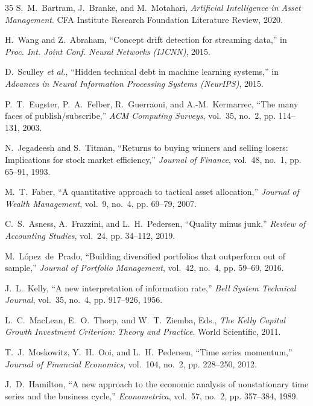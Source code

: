 \documentclass[10pt,twocolumn]{IEEEtran}
\begin{document}
\begin{thebibliography}{35}
S.~M.~Bartram, J.~Branke, and M.~Motahari, \emph{Artificial Intelligence in
Asset Management}. CFA Institute Research Foundation Literature Review, 2020.

H.~Wang and Z.~Abraham, ``Concept drift detection for streaming data,'' in
\emph{Proc. Int. Joint Conf. Neural Networks (IJCNN)}, 2015.

D.~Sculley \emph{et al.}, ``Hidden technical debt in machine learning
systems,'' in \emph{Advances in Neural Information Processing Systems
(NeurIPS)}, 2015.

P.~T.~Eugster, P.~A.~Felber, R.~Guerraoui, and A.-M.~Kermarrec, ``The many
faces of publish/subscribe,'' \emph{ACM Computing Surveys}, vol.~35, no.~2,
pp. 114--131, 2003.

N.~Jegadeesh and S.~Titman, ``Returns to buying winners and selling losers:
Implications for stock market efficiency,'' \emph{Journal of Finance},
vol.~48, no.~1, pp. 65--91, 1993.

M.~T.~Faber, ``A quantitative approach to tactical asset allocation,''
\emph{Journal of Wealth Management}, vol.~9, no.~4, pp. 69--79, 2007.

C.~S.~Asness, A.~Frazzini, and L.~H.~Pedersen, ``Quality minus junk,''
\emph{Review of Accounting Studies}, vol.~24, pp. 34--112, 2019.

M.~L\'opez~de~Prado, ``Building diversified portfolios that outperform
out of sample,'' \emph{Journal of Portfolio Management}, vol.~42, no.~4,
pp. 59--69, 2016.

J.~L.~Kelly, ``A new interpretation of information rate,'' \emph{Bell
System Technical Journal}, vol.~35, no.~4, pp. 917--926, 1956.

L.~C.~MacLean, E.~O.~Thorp, and W.~T.~Ziemba, Eds., \emph{The Kelly Capital
Growth Investment Criterion: Theory and Practice}. World Scientific, 2011.

T.~J.~Moskowitz, Y.~H.~Ooi, and L.~H.~Pedersen, ``Time series momentum,''
\emph{Journal of Financial Economics}, vol.~104, no.~2, pp. 228--250, 2012.

J.~D.~Hamilton, ``A new approach to the economic analysis of nonstationary
time series and the business cycle,'' \emph{Econometrica}, vol.~57, no.~2,
pp. 357--384, 1989.


\end{thebibliography}
\end{document}
